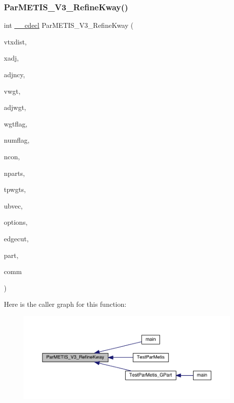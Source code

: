 \subsubsection{\texorpdfstring{Par\+M\+E\+T\+I\+S\+\_\+\+V3\+\_\+\+Refine\+Kway()}{ParMETIS\_V3\_RefineKway()}}
{\footnotesize\ttfamily int \hyperlink{a00843_a238347d7669f8f1e9c83bfe63a2730c4}{\+\_\+\+\_\+cdecl} Par\+M\+E\+T\+I\+S\+\_\+\+V3\+\_\+\+Refine\+Kway (\begin{DoxyParamCaption}\item[{\hyperlink{a00876_aaa5262be3e700770163401acb0150f52}{idx\+\_\+t} $\ast$}]{vtxdist,  }\item[{\hyperlink{a00876_aaa5262be3e700770163401acb0150f52}{idx\+\_\+t} $\ast$}]{xadj,  }\item[{\hyperlink{a00876_aaa5262be3e700770163401acb0150f52}{idx\+\_\+t} $\ast$}]{adjncy,  }\item[{\hyperlink{a00876_aaa5262be3e700770163401acb0150f52}{idx\+\_\+t} $\ast$}]{vwgt,  }\item[{\hyperlink{a00876_aaa5262be3e700770163401acb0150f52}{idx\+\_\+t} $\ast$}]{adjwgt,  }\item[{\hyperlink{a00876_aaa5262be3e700770163401acb0150f52}{idx\+\_\+t} $\ast$}]{wgtflag,  }\item[{\hyperlink{a00876_aaa5262be3e700770163401acb0150f52}{idx\+\_\+t} $\ast$}]{numflag,  }\item[{\hyperlink{a00876_aaa5262be3e700770163401acb0150f52}{idx\+\_\+t} $\ast$}]{ncon,  }\item[{\hyperlink{a00876_aaa5262be3e700770163401acb0150f52}{idx\+\_\+t} $\ast$}]{nparts,  }\item[{\hyperlink{a00876_a1924a4f6907cc3833213aba1f07fcbe9}{real\+\_\+t} $\ast$}]{tpwgts,  }\item[{\hyperlink{a00876_a1924a4f6907cc3833213aba1f07fcbe9}{real\+\_\+t} $\ast$}]{ubvec,  }\item[{\hyperlink{a00876_aaa5262be3e700770163401acb0150f52}{idx\+\_\+t} $\ast$}]{options,  }\item[{\hyperlink{a00876_aaa5262be3e700770163401acb0150f52}{idx\+\_\+t} $\ast$}]{edgecut,  }\item[{\hyperlink{a00876_aaa5262be3e700770163401acb0150f52}{idx\+\_\+t} $\ast$}]{part,  }\item[{M\+P\+I\+\_\+\+Comm $\ast$}]{comm }\end{DoxyParamCaption})}

Here is the caller graph for this function\+:\nopagebreak
\begin{figure}[H]
\begin{center}
\leavevmode
\includegraphics[width=350pt]{a00840_ad40a7809c9bdf183926da011220bad75_icgraph}
\end{center}
\end{figure}
